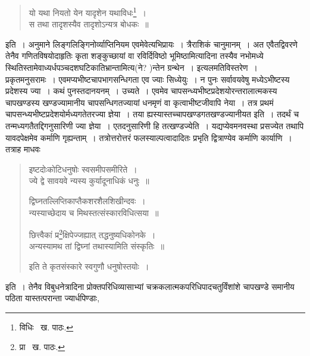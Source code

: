 \documentclass[11pt, openany]{book}
\begin{document}
\begin{quote}
{\qt यो यथा नियतो येन यादृशेन यथाविधः\renewcommand{\thefootnote}{२}\footnote{विधिः \textendash\ ख. पाठः.}~।\\
स तथा तादृशस्यैव तादृशोऽन्यत्र बोधकः~॥}
\end{quote}

\noindent इति~। अनुमाने लिङ्गलिङ्गिनोर्व्याप्तिनियम एवमेवेत्यभिप्रायः~। त्रैराशिकं चानुमानम्~। अत एवैतद्विवरणे तेनैव गणितविषयोदाहृतिः कृता {\qt शङ्कुच्छायां वा रविर्दिविष्ठो भूमिष्ठामि}त्यादिना तस्यैव नभोमध्ये स्थितिस्तामेवाध्यर्धपञ्चदशघटिकातिभ्रान्तामित्य(ने? )न्तेन ग्रन्थेन~। इत्यलमतिविस्तरेण~। प्रकृतमनुसरामः~। एवमप्यभीष्टचापभागसन्धिगता एव ज्याः सिध्येयुः~। न पुनः सर्वावयवेषु मध्येऽभीष्टस्य प्रदेशस्य ज्या~। कथं पुनस्तदानयनम्~। उच्यते~। एवमेव चापसन्ध्यभीष्टप्रदेशयोरन्तरालात्मकस्य चापखण्डस्य खण्डज्यामानीय चापसन्धिगतज्यायां धनमृणं वा कृत्वाभीष्टजीवापि नेया~। तत्र प्रथमं चापसन्ध्यभीष्टप्रदेशयोर्मध्यगतेतरज्या ज्ञेया~। तया ह्यस्यास्तच्चापखण्डगतखण्डज्यानीयत इति~। तदर्थं च तन्मध्यगतैतद्दिगनुसारिणी ज्या ज्ञेया~। एतदनुसारिणी हि तत्खण्डज्येति~। यद्यप्येवमनवस्था प्रसज्येत तथापि यावदपेक्षमेव कर्माणि गृह्यन्ताम्~। तत्रोत्तरोत्तरं फलस्याल्पत्वादादितः प्रभृति द्वित्राण्येव कर्माणि कार्याणि~। तत्राह माधवः\textendash

\newpage

\begin{quote}
{\qt इष्टदोःकोटिधनुषोः स्वसमीपसमीरिते~।\\
ज्ये द्वे सावयवे न्यस्य कुर्यादूनाधिकं धनुः~॥

द्विघ्नतल्लिप्तिकाप्तैकशरशैलशिखीन्दवः~।\\
न्यस्याच्छेदाय च मिथस्तत्संस्कारविधित्सया~॥

छित्त्वैकां प्र\renewcommand{\thefootnote}{१}\footnote{प्रा \textendash\ ख. पाठः.}क्षिपेज्जह्यात् तद्धनुष्यधिकोनके~।\\
अन्यस्यामथ तां द्विघ्नां तथास्यामिति संस्कृतिः~॥

इति ते कृतसंस्कारे स्वगुणौ धनुषोस्तयोः~।}
\end{quote}
\noindent इति~। तेनैव विबुधनेत्रादिना प्रोक्तपरिधिव्यासाभ्यां चक्रकलात्मकपरिधिपादचतुर्विंशांशे चापखण्डे समानीय पठिता यास्तत्परान्ता ज्यार्धपिण्डाः,
 
\end{document}
